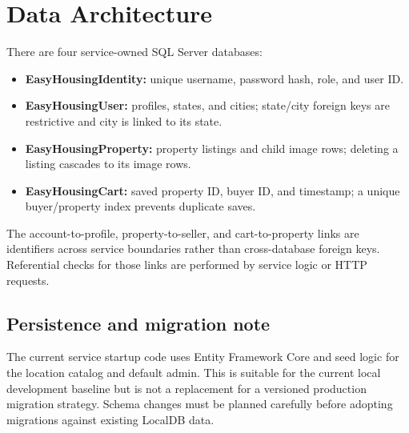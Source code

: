 \documentclass[11pt,a4paper]{article}
\newcommand{\code}[1]{\texttt{\detokenize{#1}}}
\begin{document}
\section{Data Architecture}
There are four service-owned SQL Server databases:
\begin{itemize}
  \item \textbf{EasyHousingIdentity:} unique username, password hash, role, and user ID.
  \item \textbf{EasyHousingUser:} profiles, states, and cities; state/city foreign keys
  are restrictive and city is linked to its state.
  \item \textbf{EasyHousingProperty:} property listings and child image rows; deleting
  a listing cascades to its image rows.
  \item \textbf{EasyHousingCart:} saved property ID, buyer ID, and timestamp; a unique
  buyer/property index prevents duplicate saves.
\end{itemize}
The account-to-profile, property-to-seller, and cart-to-property links are identifiers
across service boundaries rather than cross-database foreign keys. Referential checks
for those links are performed by service logic or HTTP requests.

\subsection{Persistence and migration note}
The current service startup code uses Entity Framework Core
\code{EnsureCreatedAsync()} and seed logic for the location catalog and default admin.
This is suitable for the current local development baseline but is not a replacement
for a versioned production migration strategy. Schema changes must be planned
carefully before adopting migrations against existing LocalDB data.
\end{document}

